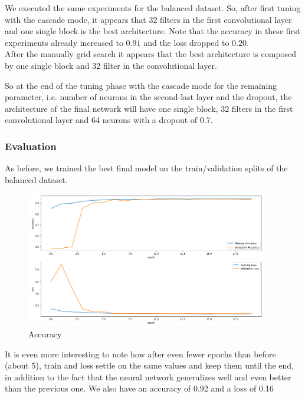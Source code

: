 \documentclass{article}
\begin{document}
We executed the same experiments for the balanced dataset. So, after first tuning with the cascade mode, it appears that 32 filters in the first convolutional layer and one single block is the best architecture. Note that the accuracy in these first experiments already increased to $0.91$ and the loss dropped to $0.20$.\\
After the manually grid search it appears that the best architecture is composed by one single block and 32 filter in the convolutional layer.

So at the end of the tuning phase with the cascade mode for the remaining parameter, i.e. number of neurons in the second-last layer and the dropout, the architecture of the final network will have one single block, 32 filters in the first convolutional layer and 64 neurons with a dropout of 0.7.

\subsubsection{Evaluation}
As before, we  trained  the  best  final  model  on  the train/validation  splits  of  the balanced dataset.

\begin{figure}[H]
    \centering
    \includegraphics[width=0.95\textwidth]{images/validation_balance.png}
    \caption{Accuracy}
    \label{fig:acc_unbalance}
\end{figure}

It is even more interesting to note how after even fewer epochs than before (about 5), train and loss settle on the same values and keep them until the end, in addition to the fact that the neural network  generalizes well and even better than the previous one.
We also have an accuracy of 0.92 and a loss of 0.16
\end{document}
